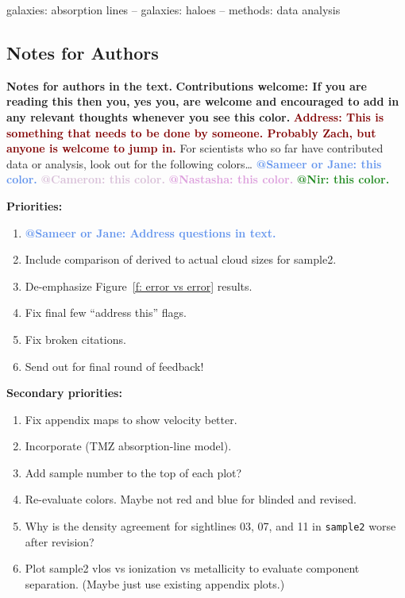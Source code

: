 \documentclass[fleqn,usenatbib]{mnras}
\makeatletter
\newcommand{\thoughts}[1]{\textcolor{BurntOrange}{\textbf{Contributions welcome: #1}}}
\newcommand{\todo}[1]{\textcolor{Maroon}{\textbf{Address: #1}}}
\newcommand{\atsameer}[1]{\textcolor{CornflowerBlue}{\textbf{@Sameer or Jane: #1}}}
\newcommand{\atcameron}[1]{\textcolor{Thistle}{\textbf{@Cameron: #1}}}
\newcommand{\atnastasha}[1]{\textcolor{Plum}{\textbf{@Nastasha: #1}}}
\newcommand{\atnir}[1]{\textcolor{ForestGreen}{\textbf{@Nir: #1}}}
\makeatother
\begin{document}
\begin{keywords}
galaxies: absorption lines -- galaxies: haloes -- methods: data analysis
\end{keywords}



\subsection{Notes for Authors}

\textbf{Notes for authors in the text.}
\thoughts{If you are reading this then you, yes you, are welcome and encouraged to add in any relevant thoughts whenever you see this color.}
\todo{This is something that needs to be done by someone. Probably Zach, but anyone is welcome to jump in.}
For scientists who so far have contributed data or analysis, look out for the following colors\ldots
\atsameer{this color.}
\atcameron{this color.}
\atnastasha{this color.}
\atnir{this color.}

\textbf{Priorities:}
\begin{enumerate}
    \item \atsameer{Address questions in text.}
    \item Include comparison of derived to actual cloud sizes for sample2.
    \item De-emphasize Figure~\ref{f: error vs error} results.
    \item Fix final few ``address this'' flags.
    \item Fix broken citations.
    \item Send out for final round of feedback!
\end{enumerate}

\textbf{Secondary priorities:}
\begin{enumerate}
\item Fix appendix maps to show velocity better.
    \item Incorporate \cite{tan2021Model} (TMZ absorption-line model).
    \item Add sample number to the top of each plot?
    \item Re-evaluate colors. Maybe not red and blue for blinded and revised.
    \item Why is the density agreement for sightlines 03, 07, and 11 in \texttt{sample2} worse after revision?
    \item Plot sample2 vlos vs ionization vs metallicity to evaluate component separation. (Maybe just use existing appendix plots.)
\end{enumerate}
\end{document}
